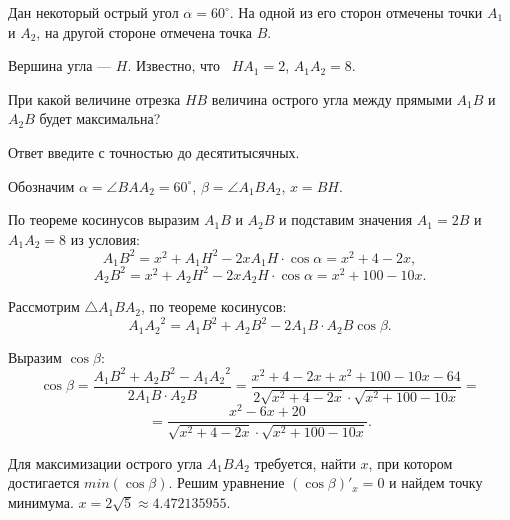
Дан некоторый острый угол $\alpha = 60^{\circ}$. На одной из его сторон отмечены точки $A_1$ и $A_2$, 
на другой стороне отмечена точка $B$. 

Вершина угла — $H$. Известно, что  $HA_1=2$, $A_1A_2=8$. 

При какой величине отрезка $HB$ величина острого угла между прямыми $A_1B$ и $A_2B$  будет максимальна? 

Ответ введите с точностью до десятитысячных.

\solutionSection

Обозначим $\alpha = \angle BAA_2=60^{\circ}$, $\beta = \angle A_1BA_2$, $x = BH$. 


По теореме косинусов выразим $A_1B$ и $A_2B$ и подставим значения $A_1 = 2B$ и $A_1A_2 = 8$ из условия:
$$A_1B^2 = x^2 + A_1H^2 - 2xA_1H\cdot \cos\alpha = x^2 + 4 - 2x,$$
$$A_2B^2 = x^2 + A_2H^2 - 2xA_2H\cdot \cos\alpha = x^2 + 100 - 10x.$$

Рассмотрим $\triangle A_1BA_2$, по теореме косинусов:
$${A_1A_2}^2 = A_1B^2 + A_2B^2 - 2A_1B\cdot A_2B \cos\beta.$$

Выразим $\cos\beta$:
$$\cos\beta = \frac{A_1B^2 + A_2B^2 - {A_1A_2}^2}{2A_1B\cdot A_2B} = \frac{x^2 + 4 - 2x + x^2 + 100 - 10x - 64}{2\sqrt{x^2 + 4 - 2x} \cdot \sqrt{x^2 + 100 - 10x}} =  $$
$$=\frac{x^2 - 6x + 20}{\sqrt{x^2 + 4 - 2x} \cdot \sqrt{x^2 + 100 - 10x}}.$$

Для максимизации острого угла $A_1BA_2$ требуется, найти $x$, при котором достигается $min(\cos\beta)$. Решим уравнение $(\cos\beta)'_x = 0$ и найдем точку минимума. $x = 2\sqrt{5} \approx 4.472135955$.

